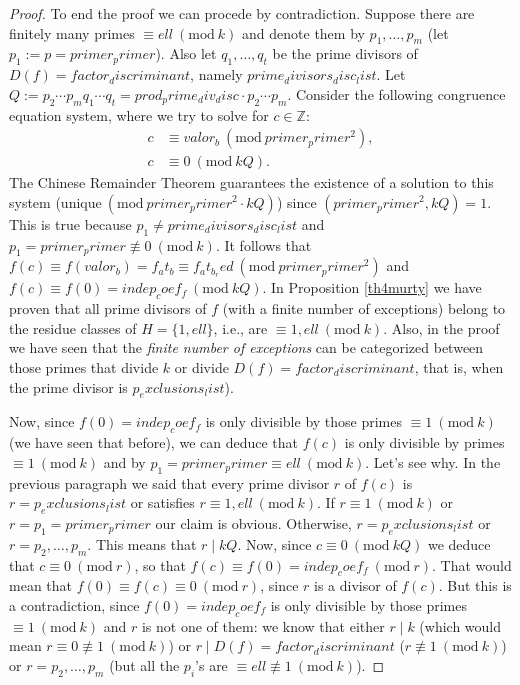 \documentclass[a4paper, 12pt]{article}
\theoremstyle{definition}
\theoremstyle{remark}
\newcommand{\Z}{\ensuremath{\mathbb{Z}}}
\newcommand{\Mod}[1]{\ (\mathrm{mod}\ #1)} %
\begin{document}
\begin{proof}
To end the proof we can procede by contradiction. Suppose there are finitely many primes $\equiv {ell}\Mod{{k}}$ and denote them by $p_1,\dots,p_m$ (let $p_1:=p={primer_primer}$). Also let $q_1,\dots,q_t$ be the prime divisors of $D(f)={factor_discriminant}$, namely ${prime_divisors_disc_list}$. Let $Q:=p_2\cdots p_mq_1\cdots q_t={prod_prime_div_disc}\cdot p_2\cdots p_m$. Consider the following congruence equation system, where we try to solve for $c\in\Z$:
	\begin{align*}
		c&\equiv {valor_b}\Mod{{primer_primer}^2},\\
		c&\equiv 0\Mod{{k}Q}.
	\end{align*}
	The Chinese Remainder Theorem guarantees the existence of a solution to this system (unique$\Mod{{primer_primer}^2\cdot{k}Q}$) since $({primer_primer}^2,{k}Q)=1$. This is true because $p_1\neq{prime_divisors_disc_list}$ and $p_1={primer_primer}\not\equiv 0 \Mod{{k}}$. It follows that $f(c)\equiv f({valor_b})={f_at_b}\equiv {f_at_b_red} \Mod{{primer_primer}^2}$ and $f(c)\equiv f(0)={indep_coef_f}\Mod{{k}Q}$. In Proposition \ref{th4murty} we have proven that all prime divisors of $f$ (with a finite number of exceptions) belong to the residue classes of $H=\{1, {ell}\}$, i.e., are $\equiv1, {ell}\Mod{{k}}$. Also, in the proof we have seen that the \textit{finite number of exceptions} can be categorized between those primes that divide ${k}$ or divide $D(f)={factor_discriminant}$, that is, when the prime divisor is ${p_exclusions_list}$).
	
	Now, since $f(0)={indep_coef_f}$ is only divisible by those primes $\equiv 1\Mod{{k}}$ (we have seen that before), we can deduce that $f(c)$ is only divisible by primes $\equiv 1\Mod{{k}}$ and by $p_1={primer_primer}\equiv {ell}\Mod{{k}}$. Let's see why. In the previous paragraph we said that every prime divisor $r$ of $f(c)$ is $r={p_exclusions_list}$ or satisfies $r\equiv 1,{ell}\Mod{{k}}$. If $r\equiv 1\Mod{{k}}$ or $r=p_1={primer_primer}$ our claim is obvious. Otherwise, $r={p_exclusions_list}$ or $r=p_2,\dots,p_m$. This means that $r\mid {k}Q$. Now, since $c\equiv 0\Mod{{k}Q}$ we deduce that $c\equiv 0\Mod{r}$, so that $f(c)\equiv f(0)={indep_coef_f}\Mod{r}$. That would mean that $f(0)\equiv f(c)\equiv 0\Mod{r}$, since $r$ is a divisor of $f(c)$. But this is a contradiction, since $f(0)={indep_coef_f}$ is only divisible by those primes $\equiv 1\Mod{{k}}$ and $r$ is not one of them: we know that either $r\mid {k}$ (which would mean $r\equiv 0\not\equiv 1\Mod{{k}}$) or $r\mid D(f)={factor_discriminant}$ ($r\not\equiv 1\Mod{{k}}$) or $r=p_2,\dots,p_m$ (but all the $p_i$'s are $\equiv{ell} \not\equiv 1\Mod{{k}}$).
    

\end{proof}
\end{document}
